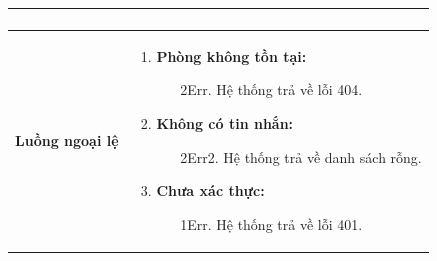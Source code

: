 {\begin{tabularx}{\textwidth}{|>{\raggedright\arraybackslash}p{3.5cm}|>{\raggedright\arraybackslash}X|}
\begin{enumerate}
\begin{enumerate}
    \end{enumerate}
\end{enumerate} \\
\hline
\textbf{Luồng ngoại lệ} &
\begin{enumerate}
    \item \textbf{Phòng không tồn tại:}
    \begin{enumerate}
        \item[2Err.] Hệ thống trả về lỗi 404.
    \end{enumerate}
    \item \textbf{Không có tin nhắn:}
    \begin{enumerate}
        \item[2Err2.] Hệ thống trả về danh sách rỗng.
    \end{enumerate}
    \item \textbf{Chưa xác thực:}
    \begin{enumerate}
        \item[1Err.] Hệ thống trả về lỗi 401.
    \end{enumerate}
\end{enumerate} \\
\hline
\end{tabularx}
}
